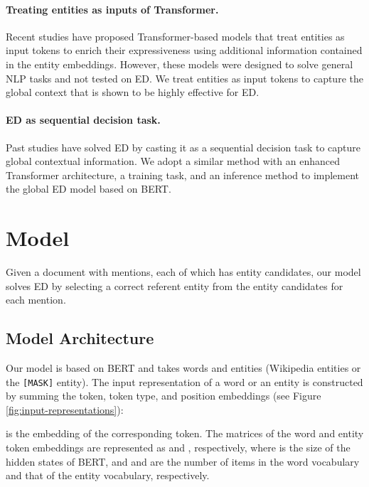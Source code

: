\documentclass[11pt]{article}
\begin{document}
\paragraph{Treating entities as inputs of Transformer.}
Recent studies \cite{Zhang2019,yamada-etal-2020-luke,sun-etal-2020-colake} have proposed Transformer-based models that treat entities as input tokens to enrich their expressiveness using additional information contained in the entity embeddings.
However, these models were designed to solve general NLP tasks and not tested on ED.
We treat entities as input tokens to capture the global context that is shown to be highly effective for ED.

\paragraph{ED as sequential decision task.} Past studies \cite{yang2019learning,Fang:2019:JEL:3308558.3313517} have solved ED by casting it as a sequential decision task to capture global contextual information.
We adopt a similar method with an enhanced Transformer architecture, a training task, and an inference method to implement the global ED model based on BERT.


\section{Model}
\label{sec:embedding-model}

Given a document with  mentions, each of which has  entity candidates, our model solves ED by selecting a correct referent entity from the entity candidates for each mention.

\subsection{Model Architecture}

Our model is based on BERT and takes words and entities (Wikipedia entities or the \texttt{[MASK]} entity).
The input representation of a word or an entity is constructed by summing the token, token type, and position embeddings (see Figure \ref{fig:input-representations}):

\vspace{1mm}
 is the embedding of the corresponding token.
The matrices of the word and entity token embeddings are represented as  and , respectively, where  is the size of the hidden states of BERT, and  and  are the number of items in the word vocabulary and that of the entity vocabulary, respectively.
\end{document}
